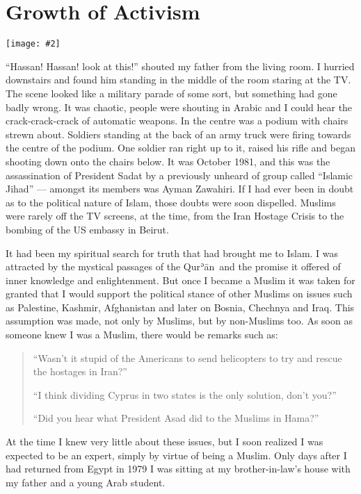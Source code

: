 \documentclass[12pt]{memoir}
\def\´{ʾ} %
\def \Quran{Qur\-\´ān} %
\def\–{-\hskip0pt}
\newcommand{\img}[3]{\begin{center}%
\texttt{[image: \#2]}\\{\small\em#3}%
\end{center}}
\begin{document}
\chapter{Growth of Activism}

\img{scale=0.7}{Assassination_of_Sadat.jpg}{}

“Hassan! Hassan! look at this!”
shouted my father from the living room.
I hurried downstairs and found him standing
in the middle of the room staring at the TV.
The scene looked like a military parade of some sort,
but something had gone badly wrong.
It was chaotic, people were shouting in Arabic
and I could hear the crack\–crack\–crack of automatic weapons.
In the centre was a podium with chairs strewn about.
Soldiers standing at the back of an army truck
were firing towards the centre of the podium.
One soldier ran right up to it,
raised his rifle and began shooting down onto the chairs below.
It was October 1981, and this was the assassination of President Sadat
by a previously unheard of group called “Islamic Jihad” —
amongst its members was Ayman Zawahiri.
If I had ever been in doubt as to the political nature of Islam,
those doubts were soon dispelled.
Muslims were rarely off the TV screens, at the time,
from the Iran Hostage Crisis to the bombing of the US embassy in Beirut.

It had been my spiritual search for truth that had brought me to Islam.
I was attracted by the mystical passages of the \Quran\
and the promise it offered of inner knowledge and enlightenment.
But once I became a Muslim it was taken for granted that I would support
the political stance of other Muslims on issues such as Palestine,
Kashmir, Afghanistan and later on Bosnia, Chechnya and Iraq.
This assumption was made, not only by Muslims, but by non-Muslims too.
As soon as someone knew I was a Muslim, there would be remarks such as:

\begin{quote}
“Wasn’t it stupid of the Americans to send helicopters
to try and rescue the hostages in Iran?”

“I think dividing Cyprus in two states is the only solution, don’t you?”

“Did you hear what President Asad did to the Muslims in Hama?”
\end{quote}

At the time I knew very little about these issues,
but I soon realized I was expected to be an expert,
simply by virtue of being a Muslim.
Only days after I had returned from Egypt in 1979
I was sitting at my brother-in-law’s house
with my father and a young Arab student.
\end{document}
